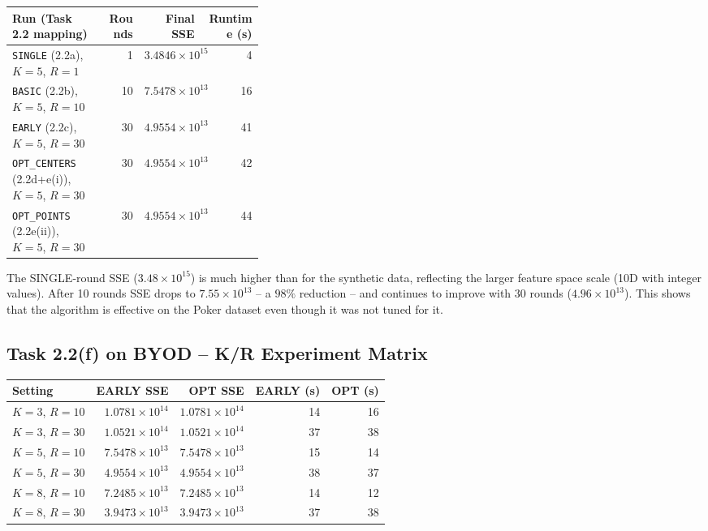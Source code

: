 \documentclass[11pt]{article}
\begin{document}
\begin{longtable}{@{}p{0.36\linewidth}rrr@{}}
  \rowcolor{tableheader}
  \color{white}\textbf{Run (Task 2.2 mapping)} &
  \color{white}\textbf{Rounds} &
  \color{white}\textbf{Final SSE} &
  \color{white}\textbf{Runtime (s)} \\
  \midrule\endhead
  \texttt{SINGLE} (2.2a), $K=5$, $R=1$            & 1  & $3.4846\times10^{15}$ & 4  \\
  \rowcolor{tablealt}
  \texttt{BASIC} (2.2b), $K=5$, $R=10$            & 10 & $7.5478\times10^{13}$ & 16 \\
  \texttt{EARLY} (2.2c), $K=5$, $R=30$            & 30 & $4.9554\times10^{13}$ & 41 \\
  \rowcolor{tablealt}
  \texttt{OPT\_CENTERS} (2.2d+e(i)), $K=5$, $R=30$ & 30 & $4.9554\times10^{13}$ & 42 \\
  \texttt{OPT\_POINTS} (2.2e(ii)), $K=5$, $R=30$  & 30 & $4.9554\times10^{13}$ & 44 \\
\end{longtable}

\begin{tcolorbox}[note, title={BYOD vs.\ Synthetic -- SSE Interpretation}]
The SINGLE-round SSE ($3.48\times10^{15}$) is much higher than for the synthetic data, reflecting the larger feature space scale (10D with integer values). After 10 rounds SSE drops to $7.55\times10^{13}$ -- a $98\%$ reduction -- and continues to improve with 30 rounds ($4.96\times10^{13}$). This shows that the algorithm is effective on the Poker dataset even though it was not tuned for it.
\end{tcolorbox}

\subsection{Task 2.2(f) on BYOD -- K/R Experiment Matrix}

\begin{longtable}{@{}lrrrr@{}}
  \rowcolor{tableheader}
  \color{white}\textbf{Setting} &
  \color{white}\textbf{EARLY SSE} &
  \color{white}\textbf{OPT SSE} &
  \color{white}\textbf{EARLY (s)} &
  \color{white}\textbf{OPT (s)} \\
  \midrule\endhead
  $K=3$, $R=10$ & $1.0781\times10^{14}$ & $1.0781\times10^{14}$ & 14 & 16 \\
  \rowcolor{tablealt}
  $K=3$, $R=30$ & $1.0521\times10^{14}$ & $1.0521\times10^{14}$ & 37 & 38 \\
  $K=5$, $R=10$ & $7.5478\times10^{13}$ & $7.5478\times10^{13}$ & 15 & 14 \\
  \rowcolor{tablealt}
  $K=5$, $R=30$ & $4.9554\times10^{13}$ & $4.9554\times10^{13}$ & 38 & 37 \\
  $K=8$, $R=10$ & $7.2485\times10^{13}$ & $7.2485\times10^{13}$ & 14 & 12 \\
  \rowcolor{tablealt}
  $K=8$, $R=30$ & $3.9473\times10^{13}$ & $3.9473\times10^{13}$ & 37 & 38 \\
\end{longtable}
\end{document}
